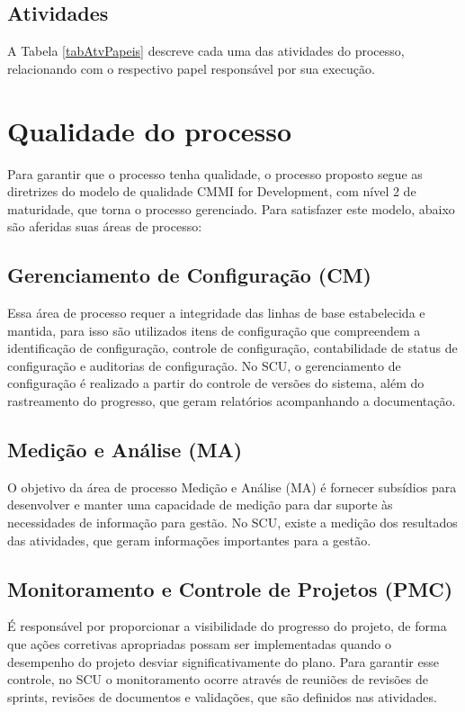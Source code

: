 \documentclass[	DIV=calc,%
							paper=a4,%
							fontsize=12pt,%
							onecolumn]{scrartcl}%
\begin{document}

\FloatBarrier


\subsection{Atividades}
A Tabela \ref{tabAtvPapeis} descreve cada uma das atividades do processo, relacionando com o respectivo papel responsável por sua execução. \\


\FloatBarrier

\section{Qualidade do processo}

Para garantir que o processo tenha qualidade, o processo proposto segue as diretrizes do modelo de qualidade CMMI for Development, com nível 2 de maturidade, que torna o processo gerenciado. Para satisfazer este modelo, abaixo são aferidas suas áreas de processo:

\subsection{Gerenciamento de Configuração (CM)}
Essa área de processo requer a integridade das linhas de base estabelecida e mantida, para isso são utilizados itens de configuração que compreendem a identificação de configuração, controle de configuração, contabilidade de status de configuração e auditorias de configuração. 
No SCU, o gerenciamento de configuração é realizado a partir do controle de versões do sistema, além do rastreamento do progresso, que geram relatórios acompanhando a documentação.

\subsection{Medição e Análise (MA)}

O objetivo da área de processo Medição e Análise (MA) é fornecer subsídios para desenvolver e manter uma capacidade de medição para dar suporte às necessidades de informação para gestão. No SCU, existe a medição dos resultados das atividades, que geram informações importantes para a gestão.


\subsection{Monitoramento e Controle de Projetos (PMC)}
É responsável por proporcionar a visibilidade do progresso do projeto, de forma que ações corretivas apropriadas possam ser implementadas quando o desempenho do projeto desviar significativamente do plano. Para garantir esse controle, no SCU o monitoramento ocorre através de reuniões de revisões de sprints, revisões de documentos e validações, que são definidos nas atividades.
\end{document}
